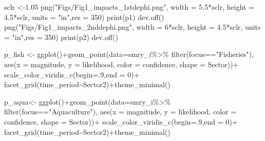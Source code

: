 \documentclass[
]{article}
\newenvironment{Shaded}{\begin{snugshade}}{\end{snugshade}}
\newcommand{\AttributeTok}[1]{\textcolor[rgb]{0.77,0.63,0.00}{#1}}
\newcommand{\DecValTok}[1]{\textcolor[rgb]{0.00,0.00,0.81}{#1}}
\newcommand{\FloatTok}[1]{\textcolor[rgb]{0.00,0.00,0.81}{#1}}
\newcommand{\FunctionTok}[1]{\textcolor[rgb]{0.00,0.00,0.00}{#1}}
\newcommand{\NormalTok}[1]{#1}
\newcommand{\OtherTok}[1]{\textcolor[rgb]{0.56,0.35,0.01}{#1}}
\newcommand{\SpecialCharTok}[1]{\textcolor[rgb]{0.00,0.00,0.00}{#1}}
\newcommand{\StringTok}[1]{\textcolor[rgb]{0.31,0.60,0.02}{#1}}
\begin{document}
\begin{Shaded}
\begin{Highlighting}[]
\NormalTok{    sclr }\OtherTok{\textless{}{-}}\FloatTok{1.05}
    \FunctionTok{png}\NormalTok{(}\StringTok{"Figs/Fig1\_impacts\_1stdephi.png"}\NormalTok{, }
        \AttributeTok{width =} \FloatTok{5.5}\SpecialCharTok{*}\NormalTok{sclr, }\AttributeTok{height =} \FloatTok{4.5}\SpecialCharTok{*}\NormalTok{sclr, }\AttributeTok{units =} \StringTok{"in"}\NormalTok{,}\AttributeTok{res =} \DecValTok{350}\NormalTok{)}
    \FunctionTok{print}\NormalTok{(p1)}
    \FunctionTok{dev.off}\NormalTok{()}
     \FunctionTok{png}\NormalTok{(}\StringTok{"Figs/Fig1\_impacts\_2nddephi.png"}\NormalTok{, }
        \AttributeTok{width =} \DecValTok{6}\SpecialCharTok{*}\NormalTok{sclr, }\AttributeTok{height =} \FloatTok{4.5}\SpecialCharTok{*}\NormalTok{sclr, }\AttributeTok{units =} \StringTok{"in"}\NormalTok{,}\AttributeTok{res =} \DecValTok{350}\NormalTok{)}
    \FunctionTok{print}\NormalTok{(p2)}
    \FunctionTok{dev.off}\NormalTok{()}
    
\NormalTok{    p\_fish }\OtherTok{\textless{}{-}} \FunctionTok{ggplot}\NormalTok{()}\SpecialCharTok{+}\FunctionTok{geom\_point}\NormalTok{(}\AttributeTok{data=}\NormalTok{smry\_i}\SpecialCharTok{\%\textgreater{}\%}
                               \FunctionTok{filter}\NormalTok{(focus}\SpecialCharTok{==}\StringTok{"Fisheries"}\NormalTok{),}
                             \FunctionTok{aes}\NormalTok{(}\AttributeTok{x     =}\NormalTok{ magnitude,}
                                             \AttributeTok{y     =}\NormalTok{ likelihood,}
                                             \AttributeTok{color =}\NormalTok{ confidence,}
                                             \AttributeTok{shape =}\NormalTok{ Sector))}\SpecialCharTok{+}
      \FunctionTok{scale\_color\_viridis\_c}\NormalTok{(}\AttributeTok{begin=}\NormalTok{.}\DecValTok{9}\NormalTok{,}\AttributeTok{end =} \DecValTok{0}\NormalTok{)}\SpecialCharTok{+}
      \FunctionTok{facet\_grid}\NormalTok{(time\_period}\SpecialCharTok{\textasciitilde{}}\NormalTok{Sector2)}\SpecialCharTok{+}\FunctionTok{theme\_minimal}\NormalTok{()}
    
\NormalTok{    p\_aqua}\OtherTok{\textless{}{-}} \FunctionTok{ggplot}\NormalTok{()}\SpecialCharTok{+}\FunctionTok{geom\_point}\NormalTok{(}\AttributeTok{data=}\NormalTok{smry\_i}\SpecialCharTok{\%\textgreater{}\%}
                               \FunctionTok{filter}\NormalTok{(focus}\SpecialCharTok{==}\StringTok{"Aquaculture"}\NormalTok{),}
                             \FunctionTok{aes}\NormalTok{(}\AttributeTok{x     =}\NormalTok{ magnitude,}
                                             \AttributeTok{y     =}\NormalTok{ likelihood,}
                                             \AttributeTok{color =}\NormalTok{ confidence,}
                                             \AttributeTok{shape =}\NormalTok{ Sector))}\SpecialCharTok{+}
      \FunctionTok{scale\_color\_viridis\_c}\NormalTok{(}\AttributeTok{begin=}\NormalTok{.}\DecValTok{9}\NormalTok{,}\AttributeTok{end =} \DecValTok{0}\NormalTok{)}\SpecialCharTok{+}
      \FunctionTok{facet\_grid}\NormalTok{(time\_period}\SpecialCharTok{\textasciitilde{}}\NormalTok{Sector2)}\SpecialCharTok{+}\FunctionTok{theme\_minimal}\NormalTok{()}
   

\end{Highlighting}
\end{Shaded}
\end{document}
